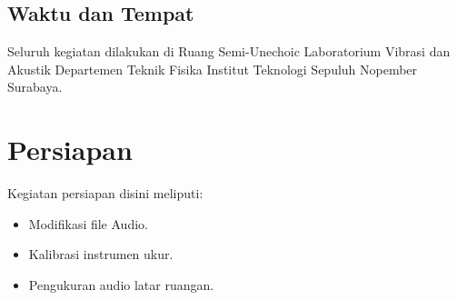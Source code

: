 \documentclass[12pt,]{article}
\begin{document}
	\subsection{Waktu dan Tempat}

	Seluruh kegiatan dilakukan di Ruang Semi-Unechoic Laboratorium Vibrasi dan Akustik
	Departemen Teknik Fisika Institut Teknologi Sepuluh Nopember Surabaya.


	\newpage
	\section{Persiapan}

	Kegiatan persiapan disini meliputi:
	\begin{itemize}
		\item Modifikasi file Audio.
		\item Kalibrasi instrumen ukur.
		\item Pengukuran audio latar ruangan.
	\end{itemize}
\end{document}
